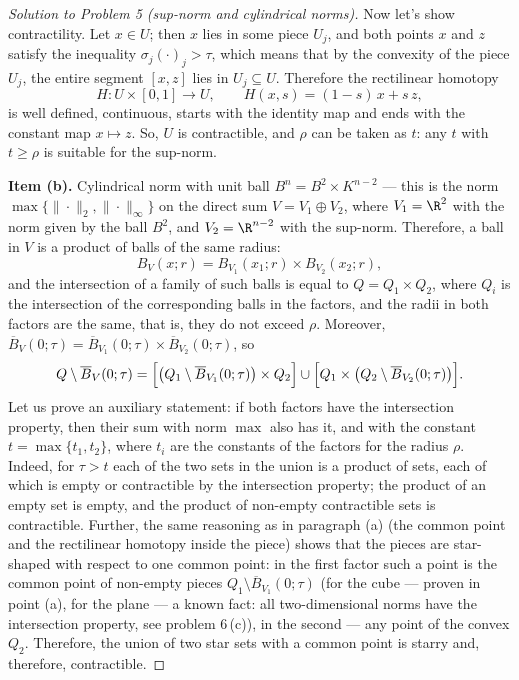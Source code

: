 \documentclass[a4paper,12pt]{report}
\begin{document}
\begin{proof}[Solution to Problem \textup{5} \textup{(}sup-norm and cylindrical norms\textup{)}]
Now let's show contractility. Let $x \in U$; then $x$ lies in some piece $U_j$, and both points $x$ and $z$ satisfy the inequality $\sigma_j (\cdot)_j > \tau$, which means that by the convexity of the piece $U_j$, the entire segment $[x, z]$ lies in $U_j \subseteq U$. Therefore the rectilinear homotopy
\[
H\colon U \times [0,1] \to U, \qquad H(x, s) = (1-s)\,x + s\,z,
\]
is well defined, continuous, starts with the identity map and ends with the constant map $x \mapsto z$. So, $U$ is contractible, and $\rho$ can be taken as $t$: any $t$ with $t \ge \rho$ is suitable for the sup-norm.

\textbf{Item \textup{(b)}.} Cylindrical norm with unit ball $B^n = B^2 \times K^{n-2}$ --- this is the norm $\max\{\|\cdot\|_2, \|\cdot\|_\infty\}$ on the direct sum $V = V_1 \oplus V_2$, where $V_1 = \R^2$ with the norm given by the ball $B^2$, and $V_2 = \R^{n-2}$ with the sup-norm. Therefore, a ball in $V$ is a product of balls of the same radius:
\[
B_V(x; r) = B_{V_1}(x_1; r) \times B_{V_2}(x_2; r),
\]
and the intersection of a family of such balls is equal to $Q = Q_1 \times Q_2$, where $Q_i$ is the intersection of the corresponding balls in the factors, and the radii in both factors are the same, that is, they do not exceed $\rho$. Moreover, $\overline B_V(0; \tau) = \overline B_{V_1}(0; \tau) \times \overline B_{V_2}(0; \tau)$, so
\[
Q \setminus \overline B_V(0; \tau) = \Bigl[\bigl(Q_1 \setminus \overline B_{V_1}(0;\tau)\bigr) \times Q_2\Bigr] \cup \Bigl[Q_1 \times \bigl(Q_2 \setminus \overline B_{V_2}(0;\tau)\bigr)\Bigr].
\]
Let us prove an auxiliary statement: if both factors have the intersection property, then their sum with norm $\max$ also has it, and with the constant $t = \max\{t_1, t_2\}$, where $t_i$ are the constants of the factors for the radius $\rho$. Indeed, for $\tau > t$ each of the two sets in the union is a product of sets, each of which is empty or contractible by the intersection property; the product of an empty set is empty, and the product of non-empty contractible sets is contractible. Further, the same reasoning as in paragraph \textup{(a)} \textup{(}the common point and the rectilinear homotopy inside the piece\textup{)} shows that the pieces are star-shaped with respect to one common point: in the first factor such a point is the common point of non-empty pieces $Q_1 \setminus \overline B_{V_1}(0;\tau)$ \textup{(}for the cube --- proven in point \textup{(a)}, for the plane --- a known fact: all two-dimensional norms have the intersection property, see problem \textup{6}\,\textup{(c)}\textup{)}, in the second --- any point of the convex $Q_2$. Therefore, the union of two star sets with a common point is starry and, therefore, contractible.


\end{proof}
\end{document}

